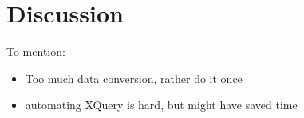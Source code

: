 \section{Discussion}
To mention:
\begin{itemize}
	\item Too much data conversion, rather do it once
	\item automating XQuery is hard, but might have saved time	
\end{itemize}